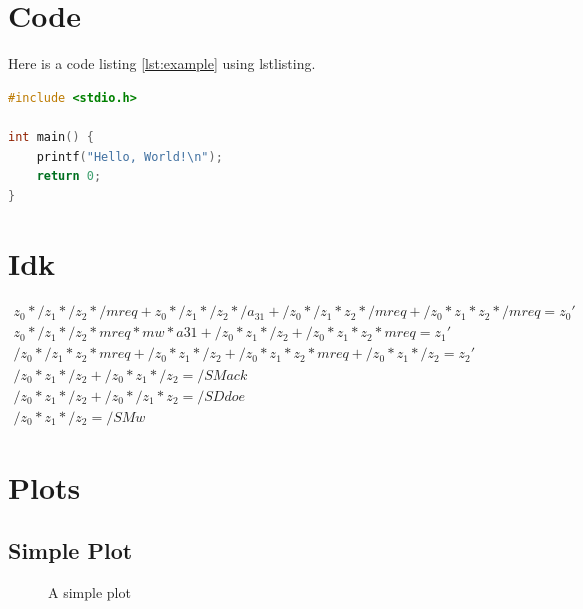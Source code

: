 \documentclass{scrartcl}
\begin{document}
\section{Code}
Here is a code listing \ref{lst:example} using lstlisting.
\begin{lstlisting}[language=C, caption={Example Code}, label=lst:example, breaklines=true, escapeinside='']
#include <stdio.h>

int main() {
    printf("Hello, World!\n");
    return 0;
}
\end{lstlisting}

\section{Idk}
\begin{align*}
	z_0*/z_1*/z_2*/mreq + z_0*/z_1*/z_2*/a_{31} + /z_0*/z_1*z_2*/mreq + /z_0*z_1*z_2*/mreq = z_0' \\
	z_0*/z_1*/z_2*mreq*mw*a31 + /z_0*z_1*/z_2 + /z_0*z_1*z_2*mreq = z_1'                          \\
	/z_0*/z_1*z_2*mreq + /z_0*z_1*/z_2 + /z_0*z_1*z_2*mreq + /z_0*z_1*/z_2 = z_2'                 \\
	/z_0*z_1*/z_2+/z_0*z_1*/z_2 = /SMack                                                          \\
	/z_0*z_1*/z_2+/z_0*/z_1*z_2 = /SDdoe                                                          \\
	/z_0*z_1*/z_2 = /SMw
\end{align*}

\section{Plots}
\subsection{Simple Plot}
\noindent
\FloatBarrier
\begin{figure}[ht]
	\centering
	\caption{A simple plot}
	\label{fig:simpleplot}
\end{figure}
\FloatBarrier
\end{document}

